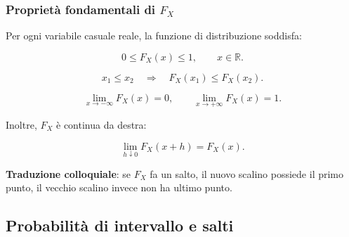 \documentclass[handout]{beamer}%
\providecommand{\1}{\mathbf{1}}
\providecommand{\QTR}[2]{\csname #1\endcsname{#2}}
\begin{document}
\begin{frame}%
%

\frametitle{Propriet\`{a} fondamentali di $F_{X}$}%


Per ogni variabile casuale reale, la funzione di distribuzione soddisfa:%

\[
0\leq F_{X}(x)\leq1, \qquad x\in\mathbb{R}.
\]
%

\[
x_{1}\leq x_{2} \quad\Longrightarrow\quad F_{X}(x_{1})\leq F_{X}(x_{2}).
\]
%

\[
\lim_{x\to-\infty}F_{X}(x)=0, \qquad\lim_{x\to+\infty}F_{X}(x)=1.
\]


\medskip

Inoltre, $F_{X}$ \`{e} continua da destra:%

\[
\lim_{h\downarrow0}F_{X}(x+h)=F_{X}(x).
\]


\medskip\textbf{Traduzione colloquiale}: se $F_{X}$ fa un salto, il nuovo
scalino possiede il primo punto, il vecchio scalino invece non ha ultimo punto.%

\transboxout
\end{frame}%




\subsection{Probabilit\`{a} di intervallo e salti}%
\end{document}
